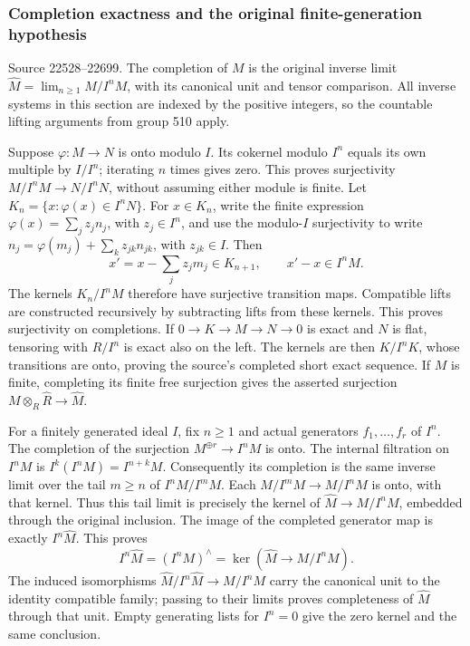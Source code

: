 \subsubsection{Completion exactness and the original finite-generation hypothesis}\label{completion-exactness-and-the-original-finite-generation-hypothesis}

Source 22528--22699. The completion of \(M\) is the original inverse limit \(\widehat M=\lim_{n\geq1}M/I^nM\), with its canonical unit and tensor comparison. All inverse systems in this section are indexed by the positive integers, so the countable lifting arguments from group 510 apply.

Suppose \(\varphi:M\to N\) is onto modulo \(I\). Its cokernel modulo \(I^n\) equals its own multiple by \(I/I^n\); iterating \(n\) times gives zero. This proves surjectivity \(M/I^nM\to N/I^nN\), without assuming either module is finite. Let \(K_n=\{x:\varphi(x)\in I^nN\}\). For \(x\in K_n\), write the finite expression \(\varphi(x)=\sum_jz_jn_j\), with \(z_j\in I^n\), and use the modulo-\(I\) surjectivity to write \(n_j=\varphi(m_j)+\sum_kz_{jk}n_{jk}\), with \(z_{jk}\in I\). Then \[
x'=x-\sum_jz_jm_j\in K_{n+1},
\qquad x'-x\in I^nM .
\] The kernels \(K_n/I^nM\) therefore have surjective transition maps. Compatible lifts are constructed recursively by subtracting lifts from these kernels. This proves surjectivity on completions. If \(0\to K\to M\to N\to0\) is exact and \(N\) is flat, tensoring with \(R/I^n\) is exact also on the left. The kernels are then \(K/I^nK\), whose transitions are onto, proving the source's completed short exact sequence. If \(M\) is finite, completing its finite free surjection gives the asserted surjection \(M\otimes_R\widehat R\to\widehat M\).

For a finitely generated ideal \(I\), fix \(n\geq1\) and actual generators \(f_1,\ldots,f_r\) of \(I^n\). The completion of the surjection \(M^{\oplus r}\to I^nM\) is onto. The internal filtration on \(I^nM\) is \(I^k(I^nM)=I^{n+k}M\). Consequently its completion is the same inverse limit over the tail \(m\geq n\) of \(I^nM/I^mM\). Each \(M/I^mM\to M/I^nM\) is onto, with that kernel. Thus this tail limit is precisely the kernel of \(\widehat M\to M/I^nM\), embedded through the original inclusion. The image of the completed generator map is exactly \(I^n\widehat M\). This proves \[
I^n\widehat M=(I^nM)^\wedge
 =\ker(\widehat M\to M/I^nM).
\] The induced isomorphisms \(\widehat M/I^n\widehat M\to M/I^nM\) carry the canonical unit to the identity compatible family; passing to their limits proves completeness of \(\widehat M\) through that unit. Empty generating lists for \(I^n=0\) give the zero kernel and the same conclusion.


